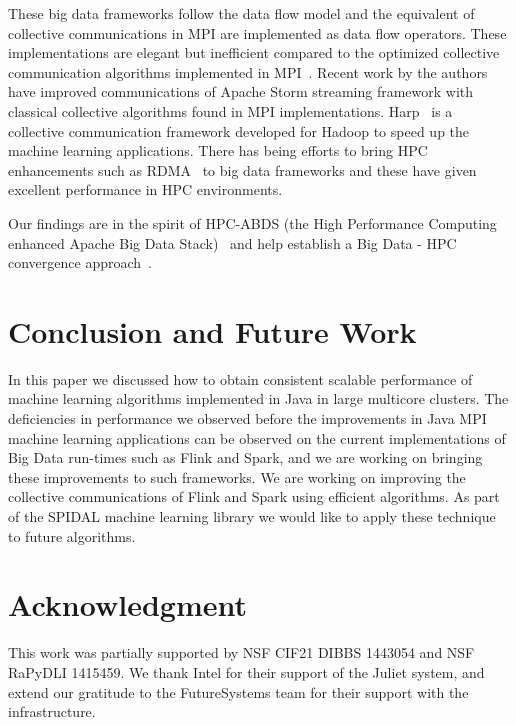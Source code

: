 \documentclass[10pt, conference, compsocconf]{IEEEtran}
\begin{document}
These big data frameworks follow the data flow model and the equivalent of collective communications in MPI are implemented as data flow operators. These implementations are elegant but inefficient compared to the optimized collective communication algorithms implemented in MPI~\cite{pjevsivac2007performance, thakur2005optimization}. Recent work by the authors~\cite{kamburugamuve2016towards} have improved communications of Apache Storm streaming framework with classical collective algorithms found in MPI implementations. Harp~\cite{zhang2015harp} is a collective communication framework developed for Hadoop to speed up the machine learning applications. There has being efforts to bring HPC enhancements such as RDMA~\cite{lu2013high} to big data frameworks and these have given excellent performance in HPC environments.

Our findings are in the spirit of HPC-ABDS (the High Performance Computing enhanced Apache Big Data Stack)~\cite{kaleidoescope} and help establish a Big Data - HPC convergence approach~\cite{fox1858big}.

\section{Conclusion and Future Work} \label{sec:conclusion}
In this paper we discussed how to obtain consistent scalable performance of machine learning algorithms implemented in Java in large multicore clusters. The deficiencies in performance we observed before the improvements in Java MPI machine learning applications can be observed on the current implementations of Big Data run-times such as Flink and Spark, and we are working on bringing these improvements to such frameworks. We are working on improving the collective communications of Flink and Spark using efficient algorithms. As part of the SPIDAL machine learning library we would like to apply these technique to future algorithms.

\section*{Acknowledgment}
This work was partially supported by NSF CIF21 DIBBS 1443054 and NSF RaPyDLI 1415459. We thank Intel  for their support of the Juliet system, and extend our gratitude to the FutureSystems team for their support with the infrastructure. 

\end{document}
